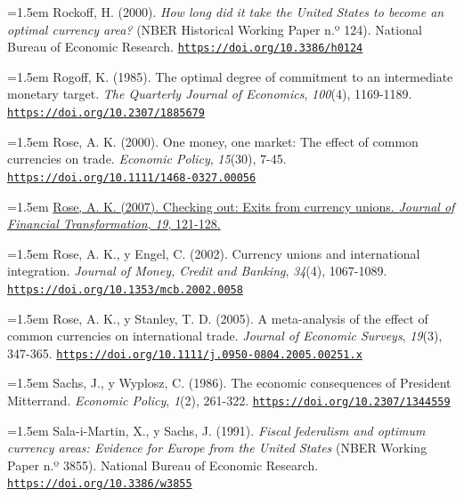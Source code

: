 \documentclass[10pt,a4paper]{article}
\begin{document}
\noindent\hangindent=1.5em Rockoff, H. (2000). \textit{How long did it take the United States to become an optimal currency area?} (NBER Historical Working Paper n.º 124). National Bureau of Economic Research. \href{https://doi.org/10.3386/h0124}{\nolinkurl{https://doi.org/10.3386/h0124}}

\noindent\hangindent=1.5em Rogoff, K. (1985). The optimal degree of commitment to an intermediate monetary target. \textit{The Quarterly Journal of Economics}, \textit{100}(4), 1169-1189. \href{https://doi.org/10.2307/1885679}{\nolinkurl{https://doi.org/10.2307/1885679}}

\noindent\hangindent=1.5em Rose, A. K. (2000). One money, one market: The effect of common currencies on trade. \textit{Economic Policy}, \textit{15}(30), 7-45. \href{https://doi.org/10.1111/1468-0327.00056}{\nolinkurl{https://doi.org/10.1111/1468-0327.00056}}

\noindent\hangindent=1.5em \href{https://ideas.repec.org/a/ris/jofitr/1404.html}{Rose, A. K. (2007). Checking out: Exits from currency unions. \textit{Journal of Financial Transformation}, \textit{19}, 121-128.}

\noindent\hangindent=1.5em Rose, A. K., y Engel, C. (2002). Currency unions and international integration. \textit{Journal of Money, Credit and Banking}, \textit{34}(4), 1067-1089. \href{https://doi.org/10.1353/mcb.2002.0058}{\nolinkurl{https://doi.org/10.1353/mcb.2002.0058}}

\noindent\hangindent=1.5em Rose, A. K., y Stanley, T. D. (2005). A meta-analysis of the effect of common currencies on international trade. \textit{Journal of Economic Surveys}, \textit{19}(3), 347-365. \href{https://doi.org/10.1111/j.0950-0804.2005.00251.x}{\nolinkurl{https://doi.org/10.1111/j.0950-0804.2005.00251.x}}

\noindent\hangindent=1.5em Sachs, J., y Wyplosz, C. (1986). The economic consequences of President Mitterrand. \textit{Economic Policy}, \textit{1}(2), 261-322. \href{https://doi.org/10.2307/1344559}{\nolinkurl{https://doi.org/10.2307/1344559}}

\noindent\hangindent=1.5em Sala-i-Martin, X., y Sachs, J. (1991). \textit{Fiscal federalism and optimum currency areas: Evidence for Europe from the United States} (NBER Working Paper n.º 3855). National Bureau of Economic Research. \href{https://doi.org/10.3386/w3855}{\nolinkurl{https://doi.org/10.3386/w3855}}
\end{document}
